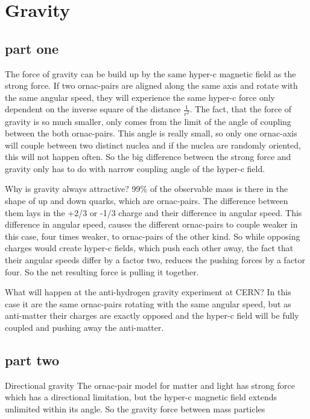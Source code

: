\chapter{Gravity}

\section{part one}

The force of gravity can be build up by the same hyper-c magnetic field as the strong force. If two ornac-pairs are aligned along the same axis and rotate with the same angular speed, they will experience the same hyper-c force only  dependent on the inverse square of the distance $\frac{1}{r^2}$. The fact, that the force of gravity is so much smaller, only comes from the limit of the angle of coupling between the both ornac-pairs. This angle is really small, so only one ornac-axis will couple between two distinct nuclea and if the nuclea are randomly oriented, this will not happen often. So the big difference between the strong force and gravity only has to do with narrow coupling angle of the hyper-c field.

Why is gravity always attractive? 99\% of the observable mass is there in the shape of up and down quarks, which are ornac-pairs. The difference between them lays in the +2/3 or -1/3 charge and their difference in angular speed. This difference in angular speed, causes the different ornac-pairs to couple weaker in this case, four times weaker, to ornac-pairs of the other kind. So while opposing charges would create hyper-c fields, which push each other away, the fact that their angular speeds differ by a factor two, reduces the pushing forces by a factor four. So the net resulting force is pulling it together.

What will happen at the anti-hydrogen gravity experiment at CERN? In this case it are the same ornac-pairs rotating with the same angular speed, but as anti-matter their charges are exactly opposed and the hyper-c field will be fully coupled and pushing away the anti-matter.


\section{part two}

Directional gravity
The ornac-pair model for matter and light has strong force which has a directional limitation, but the hyper-c magnetic field extends unlimited within its angle. So the gravity force between mass particles

